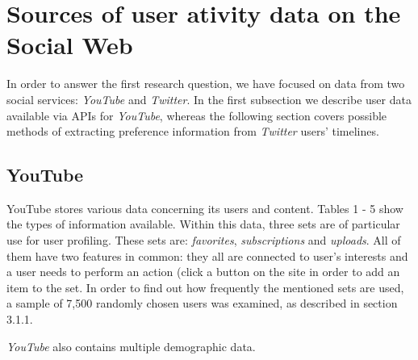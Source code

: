 \section{Sources of user ativity data on the Social Web}
In order to answer the first research question, we have focused on data from two social services: \textit{YouTube} and \textit{Twitter}. In the first subsection we describe user data available via APIs for \textit{YouTube}, whereas the
following section covers possible methods of extracting preference information from \textit{Twitter} users' timelines.
\subsection{YouTube}
YouTube stores various data concerning its users and content. Tables
1 - 5 show the types of information
available. Within this data, three sets are of particular use for user
profiling. These sets are: \emph{favorites}, \emph{subscriptions} and
\emph{uploads}. All of them have two features in common: they all are connected
to user's interests and a user needs to perform an action (\eg click a button on the site
in order to add an item to the set. In order to find out how frequently the
mentioned sets are used, a sample of 7,500 randomly chosen users was examined,
as described in section 3.1.1.

\textit{YouTube} also contains multiple demographic data.

